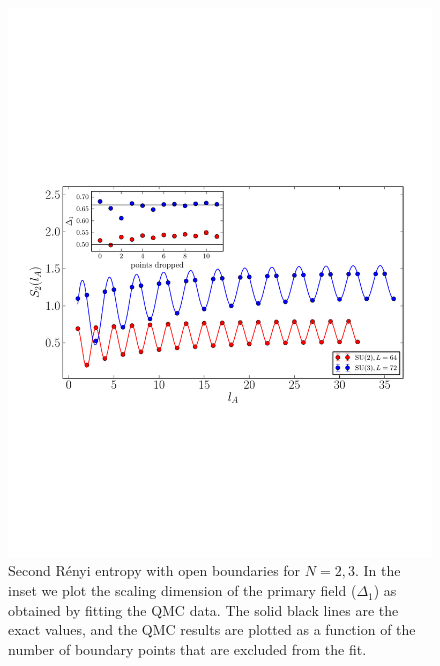 \documentclass[aps,prb,reprint,floatfix]{revtex4-1}
\begin{document}
\begin{figure}
\centerline{\includegraphics[angle=0,width=1.0\columnwidth]{su2su3Kll.pdf}}
\caption{Second R\'{e}nyi entropy with open boundaries for $N=2,3$.  In the inset we plot the scaling dimension of the primary field ($\Delta_{1}$) as obtained by fitting the QMC data. The solid black lines are the exact values, and the QMC results are plotted as a function of the number of boundary points that are excluded from the fit.}
\label{fig:su2su3Kll}
\end{figure}
\end{document}
